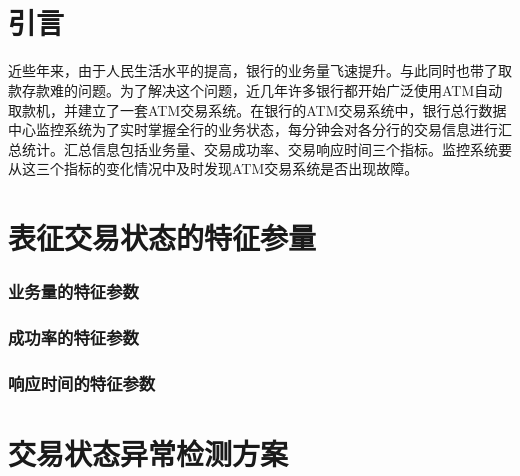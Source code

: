 \documentclass[a4paper]{article}
\begin{document}
\begin{titlepage}

%

\end{titlepage}

\begin{large}
	\begin{flushright}
		
	\end{flushright}
\end{large}
\ \ \\\\

\begin{abstract}
\textit{}
\end{abstract}

\newpage

\tableofcontents

\newpage

\part{引言}
近些年来，由于人民生活水平的提高，银行的业务量飞速提升。与此同时也带了取款存款难的问题。为了解决这个问题，近几年许多银行都开始广泛使用ATM自动取款机，并建立了一套ATM交易系统。在银行的ATM交易系统中，银行总行数据中心监控系统为了实时掌握全行的业务状态，每分钟会对各分行的交易信息进行汇总统计。汇总信息包括业务量、交易成功率、交易响应时间三个指标。监控系统要从这三个指标的变化情况中及时发现ATM交易系统是否出现故障。

\part{表征交易状态的特征参量}
\section{业务量的特征参数}
\section{成功率的特征参数}
\section{响应时间的特征参数}

\part{交易状态异常检测方案}
\end{document}
